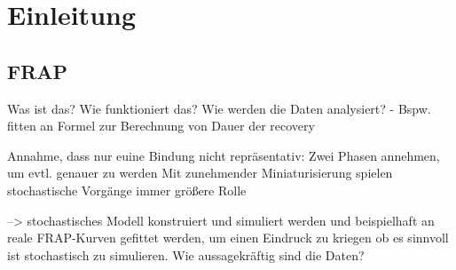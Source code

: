 \chapter{Einleitung}
\section{FRAP}
Was ist das?
Wie funktioniert das?
Wie werden die Daten analysiert? - Bspw. fitten an Formel zur Berechnung von Dauer der recovery

Annahme, dass nur euine Bindung nicht repräsentativ: Zwei Phasen annehmen, um evtl. genauer zu werden
Mit zunehmender Miniaturisierung spielen stochastische Vorgänge immer größere Rolle

--> stochastisches Modell konstruiert und simuliert werden und beispielhaft an reale FRAP-Kurven gefittet werden, um einen Eindruck zu kriegen ob es sinnvoll ist stochastisch zu simulieren. Wie aussagekräftig sind die Daten?


